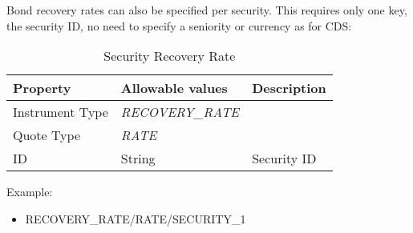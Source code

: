 Bond recovery rates can also be specified per security. This requires only one key, the security ID, no need to specify a seniority or currency as for CDS:

\begin{table}[H]
\centering
  \begin{tabular}{|p{3cm}|p{3.5cm}|p{7cm}|}
    \hline
    {\bf Property} & {\bf Allowable values} & {\bf Description} \\ \hline
    Instrument Type & \emph{RECOVERY\_RATE} & \\ \hline
    Quote Type & \emph{RATE} & \\ \hline
    ID & String &  Security ID \\ \hline
  \end{tabular}
  \caption{Security Recovery Rate}
  \label{tab:secrecrate_quote}
\end{table}

Example:
\begin{itemize}
\item {RECOVERY\_RATE/RATE/SECURITY\_1}
\end{itemize}




